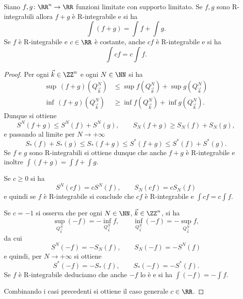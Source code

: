 \begin{theorem}
Siano $f,g\colon \RR^n \to \RR$ funzioni limitate con supporto limitato.
Se $f,g$ sono R-integrabili allora $f+g$ è R-integrabile e si ha 
\[
    \int (f+g) = \int\!\! f + \int\!\! g.
\]
Se $f$ è R-integrabile e $c\in \RR$ è costante, anche $c f$ è R-integrabile 
e si ha 
\[
    \int\!\! c f = c \!\int\!\! f.
\]
\end{theorem}
\begin{proof}
Per ogni $\vec k\in\ZZ^n$ e ogni $N\in \NN$
si ha
\begin{align*}
  \sup\, (f+g)(Q^N_{\vec k}) &\le \sup f(Q^N_{\vec k}) + \sup g(Q^N_{\vec k})\\
  \inf\, (f+g)(Q^N_{\vec k}) &\ge \inf f(Q^N_{\vec k}) + \inf g(Q^N_{\vec k}).
\end{align*}
Dunque si ottiene
\[
    S^N(f+g) \le S^N(f) + S^N(g),  \qquad
    S_N(f+g) \ge S_N(f) + S_N(g), 
\]
e passando al limite per $N\to +\infty$ 
\[
   S_*(f) + S_*(g) \le S_*(f+g) \le S^*(f+g) \le S^*(f) + S^*(g).
\]
Se $f$ e $g$ sono R-integrabili si ottiene dunque che anche $f+g$ 
è R-integrabile e inoltre $\int (f+g) = \int\! f + \int\! g$.

Se $c \ge 0$ si ha 
\[
   S^N(c f) = c S^N(f), \qquad S_N(c f) = c S_N(f)
\]
e quindi se $f$ è R-integrabile si conclude 
che $c f$ è R-integrabile e $\int\! c f = c \int\! f$.

Se $c = -1$ si osserva che per ogni $N\in \NN$, $\vec k\in \ZZ^n$, 
si ha 
\[
   \sup_{Q^N_{\vec k}} (-f) = -\inf_{Q^N_{\vec k}} f,
   \qquad 
   \inf_{Q^N_{\vec k}} (-f) = -\sup_{Q^N_{\vec k}} f,
\]
da cui 
\[
    S^N(-f) = -S_N(f), \qquad S_N(-f) = -S^N(f)
\]
e quindi, per $N\to +\infty$ si ottiene 
\[
  S^*(-f) = -S_*(f), \qquad S_*(-f) = - S^*(f).
\]
Se $f$ è R-integrabile deduciamo che anche $-f$ lo è e si ha 
$\int (-f) = -\int\! f$.

Combinando i casi precedenti si ottiene il caso generale $c \in \RR$.
\end{proof}

